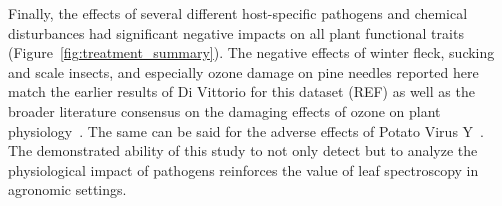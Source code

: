 Finally, the effects of several different host-specific pathogens and chemical disturbances had significant negative impacts on all plant functional traits (Figure~\ref{fig:treatment_summary}).
The negative effects of winter fleck, sucking and scale insects, and especially ozone damage on pine needles reported here match the earlier results of Di Vittorio for this dataset (REF) as well as the broader literature consensus on the damaging effects of ozone on plant physiology~\cite{lindroth_2010_impacts}.
The same can be said for the adverse effects of Potato Virus Y~\cite{scholthof_2011_top10}.
The demonstrated ability of this study to not only detect but to analyze the physiological impact of pathogens reinforces the value of leaf spectroscopy in agronomic settings.
% 
% 


